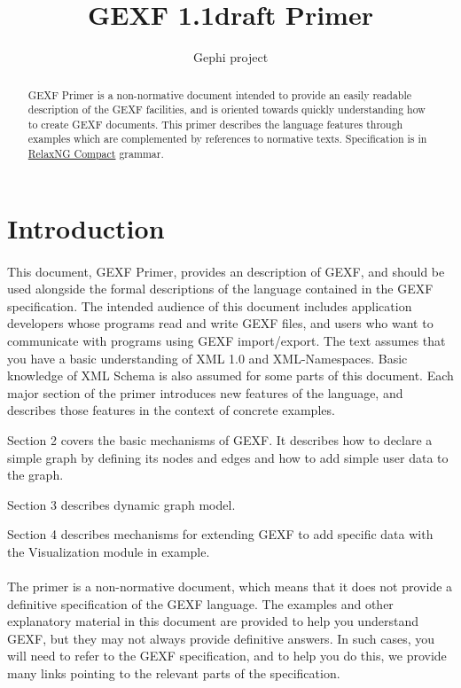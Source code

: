 \documentclass[a4paper,10pt]{article}
\title{GEXF 1.1draft Primer}
\author{Gephi project}
\begin{document}
\maketitle

\begin{abstract}
GEXF Primer is a non-normative document intended to provide an easily readable description of the GEXF facilities, and is oriented towards quickly understanding how to create GEXF documents. This primer describes the language features through examples which are complemented by references to normative texts. Specification is in \href{http://relaxng.org/compact-tutorial-20030326.html}{RelaxNG Compact} grammar.
\end{abstract}

\tableofcontents

\section{Introduction} \label{introduction}

\paragraph{}
This document, GEXF Primer, provides an description of GEXF, and should be used alongside the formal descriptions of the language contained in the GEXF specification. The intended audience of this document includes application developers whose programs read and write GEXF files, and users who want to communicate with programs using GEXF import/export. The text assumes that you have a basic understanding of XML 1.0 and  XML-Namespaces. Basic knowledge of XML Schema is also assumed for some parts of this document. Each major section of the primer introduces new features of the language, and describes those features in the context of concrete examples.

Section 2 covers the basic mechanisms of GEXF. It describes how to declare a simple graph by defining its nodes and edges and how to add simple user data to the graph.

Section 3 describes dynamic graph model.

Section 4 describes mechanisms for extending GEXF to add specific data with the Visualization module in example.

\paragraph{}
The primer is a non-normative document, which means that it does not provide a definitive specification of the GEXF language. The examples and other explanatory material in this document are provided to help you understand GEXF, but they may not always provide definitive answers. In such cases, you will need to refer to the GEXF specification, and to help you do this, we provide many links pointing to the relevant parts of the specification.
\end{document}
